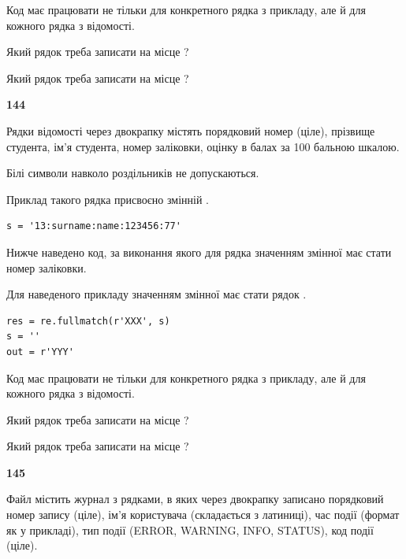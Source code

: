 Код має працювати не тільки для конкретного рядка з прикладу, але й для кожного рядка з відомості.




Який рядок треба записати на місце  ?\par
\vspace{5mm}


Який рядок треба записати на місце  ?\par


\newpage

{\begin {center}\textbf{ 144}\end {center}}\par
Рядки відомості через двокрапку містять порядковий номер (ціле), пріз\-ви\-ще студен\-та, ім'я студента, номер заліковки, оцінку в балах за 100 бальною шкалою.

Білі символи навколо роздільників не допускаються.

Приклад такого рядка присвоєно змінній .



\begin{verbatim}
s = '13:surname:name:123456:77'
\end{verbatim}


Нижче наведено код, за виконання якого для рядка  значенням змінної  має стати номер заліковки.

Для наведеного прикладу значенням змінної  має стати рядок  .



\begin{verbatim}
res = re.fullmatch(r'XXX', s)
s = ''
out = r'YYY'
\end{verbatim}


Код має працювати не тільки для конкретного рядка з прикладу, але й для кожного рядка з відомості.




Який рядок треба записати на місце  ?\par
\vspace{5mm}


Який рядок треба записати на місце  ?\par


\newpage

{\begin {center}\textbf{ 145}\end {center}}\par
Файл  містить журнал з рядками, в яких через двокрапку записано поряд\-ко\-вий номер запису (ціле), ім'я користувача (складається з латиниці), час події (фор\-мат як у прикладі), тип події (ERROR, WARNING, INFO, STATUS), код події (ціле).

